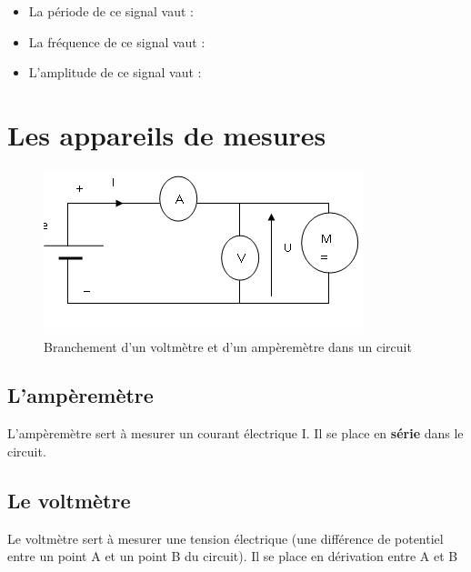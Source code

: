 \documentclass[10pt,fleqn]{article} %
\begin{document}
    \begin{itemize}
        \item La période de ce signal vaut : 
        \item La fréquence de ce signal vaut : 
        \item  L'amplitude de ce signal vaut : 
    \end{itemize}
    \pagebreak
    \section{Les appareils de mesures}
    \begin{figure}[h]
        \centering
        \includegraphics[height=0.2\textheight]{images/branchement.png}
        \caption{Branchement d'un voltmètre et d'un ampèremètre dans un circuit}
        \label{fig:branchement}
    \end{figure}

    \subsection{L'ampèremètre}
    L'ampèremètre sert à mesurer un courant électrique I. Il se place en \textbf{série} dans le circuit.

    \subsection{Le voltmètre}
    Le voltmètre sert à mesurer une tension électrique (une différence de potentiel entre un point A et un point B du circuit). Il se place en dérivation entre A et B
\end{document}
